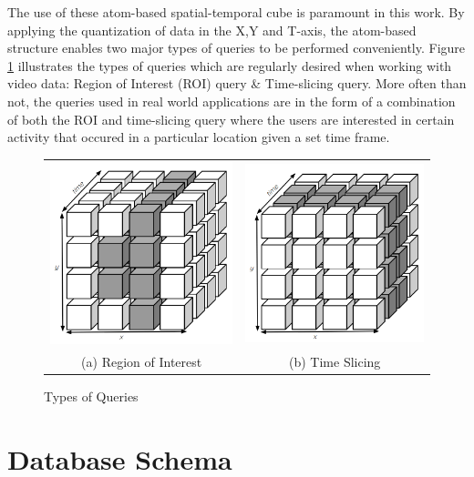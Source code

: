 The use of these atom-based spatial-temporal cube is paramount in this work. By applying the quantization of data in the X,Y and T-axis, the atom-based structure enables two major types of queries to be performed conveniently. Figure \ref{fig:typesofQuery} illustrates the types of queries which are regularly desired when working with video data: Region of Interest (ROI) query \& Time-slicing query. More often than not, the queries used in real world applications are in the form of a combination of both the ROI and time-slicing query where the users are interested in certain activity that occured in a particular location given a set time frame. 




\begin{figure}[htb!]
  \centering
  

\begin{tabular}{cc}
 \includegraphics[width=0.4\linewidth]{image/general/atom_ROI.PNG} &  \includegraphics[width=0.4\linewidth]{image/general/atom_time_slicing.PNG}\\
(a) Region of Interest & (b) Time Slicing
\end{tabular}


\caption{Types of Queries} \label{fig:typesofQuery}
\end{figure}



\section{Database Schema}

